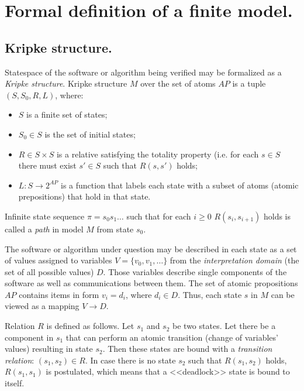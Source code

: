 \documentclass[a4paper,notitlepage,14pt]{article}
\begin{document}
\section{Formal definition of a finite model.}
\label{sec:form-defin-finite}

\subsection{Kripke structure.}
\label{sec:kripke-structure}

Statespace of the software or algorithm being verified may be formalized as a \emph{Kripke
structure}. Kripke structure $M$ over the set of atoms $AP$ is a tuple $(S, S_0, R, L)$,
where:

\begin{itemize}
\item $S$ is a finite set of states;
\item $S_0 \in S$ is the set of initial states;
\item $R \in S \times S$ is a relative satisfying the totality property (i.e. for each $s
  \in S$ there must exist $s' \in S$ such that $R(s, s')$ holds;
\item $L\colon S \rightarrow 2^{AP}$ is a function that labels each state with a subset of
  atoms (atomic prepositions) that hold in that state.
\end{itemize}

Infinite state sequence $\pi = s_0 s_1 \ldots$ such that for each $i \geq 0$ $R(s_i,
s_{i+1})$ holds is called a \emph{path} in model $M$ from state $s_0$.

The software or algorithm under question may be described in each state as a set of
values assigned to variables $V = \{v_0, v_1, \ldots\}$ from the \emph{interpretation domain}
(the set of all possible values) $D$. Those variables describe single components of the
software as well as communications between them. The set of atomic propositions $AP$
contains items in form $v_i = d_i$, where $d_i \in D$. Thus, each state $s$ in $M$ can be
viewed as a mapping $V \rightarrow D$.

Relation $R$ is defined as follows. Let $s_1$ and $s_2$ be two states. Let there be a
component in $s_1$ that can perform an atomic transition (change of variables' values)
resulting in state $s_2$. Then these states are bound with a \emph{transition relation}:
$(s_1, s_2) \in R$. In case there is no state $s_2$ such that $R(s_1, s_2)$ holds, $R(s_1,
s_1)$ is postulated, which means that a <<deadlock>> state is bound to itself.
\end{document}
